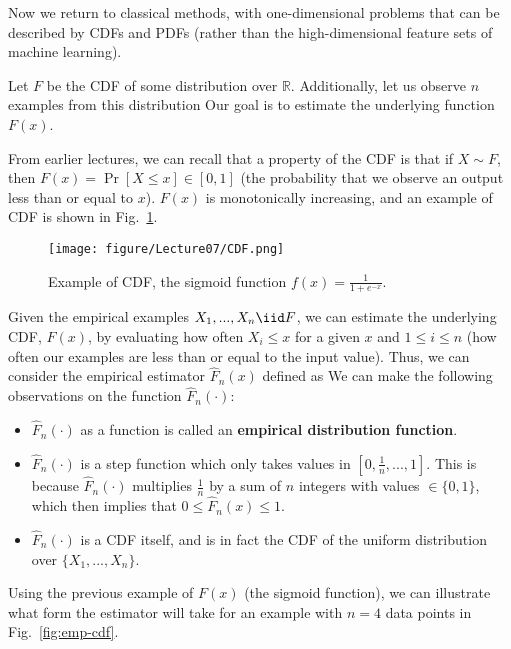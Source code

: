 Now we return to classical methods, with one-dimensional problems that can be described by CDFs and PDFs (rather than the high-dimensional feature sets of machine learning).

Let $F$ be the CDF of some distribution over $\mathbb{R}$. Additionally, let us observe $n$ examples from this distribution
Our goal is to estimate the underlying function $F(x)$.

From earlier lectures, we can recall that a property of the CDF is that if $X \sim F$, then $\boxed{F(x) =\Pr  \left[X \leq x\right]} \in \left[0, 1\right]$ (the probability that we observe an output less than or equal to $x$). $F(x)$ is monotonically increasing, and an example of CDF is shown in Fig.~\ref{fig:cdf}.

\begin{figure}[htbp!]
	\centering
	\texttt{[image: figure/Lecture07/CDF.png]}
	\caption{Example of CDF,  the sigmoid function $f(x) = \frac{1}{1+e^{-x}}$.} \label{fig:cdf}
\end{figure}

Given the empirical examples $X_1, ..., X_n \iid F$, we can estimate the underlying CDF, $F(x)$, by evaluating how often $X_i \leq x$ for a given $x$ and $1 \leq i \leq n$ (how often our examples are less than or equal to the input value). Thus, we can consider the empirical estimator $\hat{F}_n(x)$ defined as
We can make the following observations on the function $\hat{F}_n(\cdot)$:
\begin{itemize}
	\item$\hat{F}_n(\cdot)$ as a function is called an \textbf{empirical distribution function}. 
	\item $\hat{F}_n(\cdot)$ is a step function which only takes values in $\left[0, \frac{1}{n}, ..., 1 \right]$. This is because $\hat{F}_n(\cdot)$ multiplies $\frac{1}{n}$ by a sum of $n$ integers with values $\in \{0,1\}$, which then implies that $0 \leq \hat{F}_n(x) \leq 1$. 
	\item$\hat{F}_n(\cdot)$ is a CDF itself, and  is in fact the CDF of the uniform distribution over $\{X_1, ..., X_n\}$.
\end{itemize}
Using the previous example of $F(x)$ (the sigmoid function), we can illustrate what form the estimator will take for an example with $n = 4$ data points in Fig.~\ref{fig:emp-cdf}.


